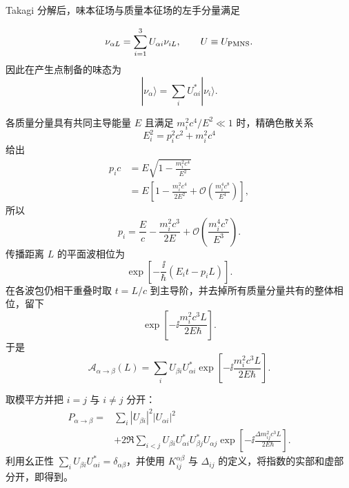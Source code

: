 \begin{derivation}[质量本征态传播与中微子振荡概率]
Takagi 分解后，味本征场与质量本征场的左手分量满足

\begin{equation*}
\nu_{\alpha L}=\sum_{i=1}^3U_{\alpha i}\nu_{iL},
\qquad U\equiv U_{\rm PMNS}.
\end{equation*}
因此在产生点制备的味态为
\begin{equation*}
|\nu_\alpha\rangle=\sum_iU_{\alpha i}^*|\nu_i\rangle.
\end{equation*}

各质量分量具有共同主导能量 $E$ 且满足 $m_i^2c^4/E^2\ll1$ 时，精确色散关系
\begin{equation*}
E_i^2=p_i^2c^2+m_i^2c^4
\end{equation*}
给出
\begin{align*}
p_ic
&=E\sqrt{1-\frac{m_i^2c^4}{E^2}}\\
&=E\left[1-\frac{m_i^2c^4}{2E^2}
+\mathcal O\!\left(\frac{m_i^4c^8}{E^4}\right)\right],
\end{align*}
所以
\begin{equation*}
p_i=\frac Ec-\frac{m_i^2c^3}{2E}
+\mathcal O\!\left(\frac{m_i^4c^7}{E^3}\right).
\end{equation*}
传播距离 $L$ 的平面波相位为
\begin{equation*}
\exp\!\left[-\frac{\ii}{\hbar}(E_it-p_iL)\right].
\end{equation*}
在各波包仍相干重叠时取 $t=L/c$ 到主导阶，并去掉所有质量分量共有的整体相位，留下
\begin{equation*}
\exp\!\left[-\ii\frac{m_i^2c^3L}{2E\hbar}\right].
\end{equation*}
于是
\begin{equation*}
\mathcal A_{\alpha\to\beta}(L)
=\sum_iU_{\beta i}U_{\alpha i}^*
\exp\!\left[-\ii\frac{m_i^2c^3L}{2E\hbar}\right].
\end{equation*}

取模平方并把 $i=j$ 与 $i\neq j$ 分开：
\begin{align*}
P_{\alpha\to\beta}
={}&\sum_i|U_{\beta i}|^2|U_{\alpha i}|^2\\
&+2\Re\sum_{i<j}
U_{\beta i}U_{\alpha i}^*U_{\beta j}^*U_{\alpha j}
\exp\!\left[-\ii\frac{\Delta m_{ij}^2c^3L}{2E\hbar}\right].
\end{align*}
利用幺正性 $\sum_iU_{\beta i}U_{\alpha i}^*=\delta_{\alpha\beta}$，并使用 $K_{ij}^{\alpha\beta}$ 与 $\Delta_{ij}$ 的定义，将指数的实部和虚部分开，即得到。

\end{derivation}

